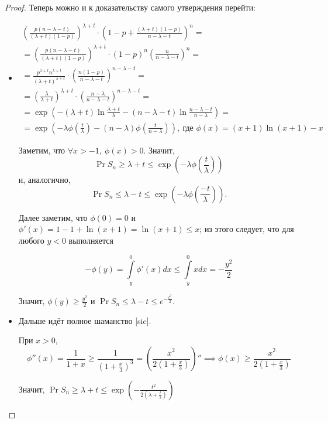 \begin{proof}
    Теперь можно и к доказательству самого утверждения перейти:
    \newcommand*\circled[1]{\tikz[baseline=(char.base)]{\node[shape=circle,draw,inner sep=1pt] (char) {#1};}}
    \begin{itemize}
        \item \circled{$\leq$}
        \begin{multline*}
            \left(\frac{p(n-\lambda-t)}{(\lambda+t)(1-p)}\right)^{\lambda + t}\cdot
            \left(1-p+\frac{(\lambda+t)(1-p)}{n-\lambda-t}\right)^n =\\=
            \left(\frac{p(n-\lambda-t)}{(\lambda+t)(1-p)}\right)^{\lambda + t}\cdot
            (1-p)^n\left(\frac{n}{n-\lambda-t}\right)^n =\\=
            \frac{p^{\lambda+t}n^{\lambda+t}}{(\lambda+t)^{\lambda+t}}\cdot
            \left(\frac{n(1-p)}{n-\lambda-t}\right)^{n-\lambda-t} =\\=
            \left(\frac{\lambda}{\lambda+t}\right)^{\lambda+t}\cdot
            \left(\frac{n-\lambda}{n-\lambda-t}\right)^{n-\lambda-t} =\\=
            \exp\left( -(\lambda+t)\ln\frac{\lambda+t}{\lambda}
            -(n-\lambda-t)\ln\frac{n-\lambda-t}{n-\lambda}\right) =\\=
            \exp\left( -\lambda\phi\left( \frac{t}{\lambda} \right) - (n-\lambda)\phi\left(
            \frac{t}{n-\lambda}
            \right) \right),\ \text{где $\phi(x)=(x+1)\ln(x+1)-x$}
        \end{multline*}
        
        Заметим, что $\forall x > -1,\ \phi(x)>0$. Значит,
        \[
        \Pr{S_n \geq \lambda + t} \leq \exp\left(-\lambda\phi\left( \frac{t}{\lambda} \right) \right)
        \]
        и, аналогично,
        \[
        \Pr{S_n \leq \lambda - t} \leq \exp\left(-\lambda\phi\left( \frac{-t}{\lambda} \right)
        \right).
        \]
        
        Далее заметим, что $\phi(0) = 0$ и $\phi'(x) = 1 - 1 + \ln(x+1) = \ln(x+1) \leq x$; из этого
        следует, что для любого $y < 0$ выполняется
        
        \[
        -\phi(y) = \int\limits_y^0 \phi'(x)dx \leq \int\limits_y^0xdx = -\frac{y^2}{2}
        \]
        
        Значит, $\phi(y) \geq \frac{y^2}{2}$ и $\Pr{S_n \leq \lambda - t} \leq e^{-\frac{t^2}{2}}$.
        
        \item \circled{$\geq$}
        
        Дальше идёт полное шаманство [sic].
        
        При $x>0$,
        \[
        \phi''(x) = \frac{1}{1+x} \geq \frac{1}{\left( 1+\frac{x}{3} \right)^3} = \left(
        \frac{x^2}{2\left( 1+\frac{x}{3} \right)} \right)'' \implies
        \phi(x) \geq \frac{x^2}{2\left( 1+\frac{x}{3} \right)}
        \]
        
        Значит, $\Pr{S_n \geq \lambda + t} \leq \exp\left( -\frac{t^2}{2\left( \lambda+\frac{t}{3} \right)} \right)$
    \end{itemize}
\end{proof}


